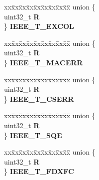 \begin{DoxyCompactItemize}
\begin{tabbing}
\end{tabbing}\item 
\mbox{\label{structFEC__tag_a77a0a0da69c60d9e67c0c24d34337867}} 
\begin{tabbing}
xx\=xx\=xx\=xx\=xx\=xx\=xx\=xx\=xx\=\kill
union \{\\
\>uint32\_t {\bfseries R}\\
\} {\bfseries IEEE\_T\_EXCOL}\\

\end{tabbing}\item 
\mbox{\label{structFEC__tag_a8a43d5dc301f8a443339d07fcd1b8ad3}} 
\begin{tabbing}
xx\=xx\=xx\=xx\=xx\=xx\=xx\=xx\=xx\=\kill
union \{\\
\>uint32\_t {\bfseries R}\\
\} {\bfseries IEEE\_T\_MACERR}\\

\end{tabbing}\item 
\mbox{\label{structFEC__tag_a969ec40346b7cfc371e3eb62cc85e6fc}} 
\begin{tabbing}
xx\=xx\=xx\=xx\=xx\=xx\=xx\=xx\=xx\=\kill
union \{\\
\>uint32\_t {\bfseries R}\\
\} {\bfseries IEEE\_T\_CSERR}\\

\end{tabbing}\item 
\mbox{\label{structFEC__tag_a169728a95a433985dd95a39f6cbb7336}} 
\begin{tabbing}
xx\=xx\=xx\=xx\=xx\=xx\=xx\=xx\=xx\=\kill
union \{\\
\>uint32\_t {\bfseries R}\\
\} {\bfseries IEEE\_T\_SQE}\\

\end{tabbing}\item 
\mbox{\label{structFEC__tag_a7f1998c4b062cbf135890a87600ab217}} 
\begin{tabbing}
xx\=xx\=xx\=xx\=xx\=xx\=xx\=xx\=xx\=\kill
union \{\\
\>uint32\_t {\bfseries R}\\
\} {\bfseries IEEE\_T\_FDXFC}\\


\end{tabbing}
\end{DoxyCompactItemize}
